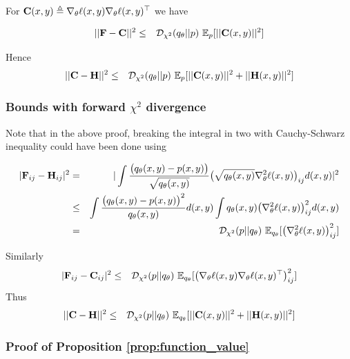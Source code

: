For ${\mathbf{C}}(x, y) \triangleq \nabla_\theta \ell(x, y) \nabla_\theta \ell(x, y)^\top$ we have

\begin{eqnarray*}
||{\mathbf{F}} - {\mathbf{C}}||^2 &\le& {\mathcal{D}}_{\chi^2}(q_\theta||p)\ \mathbb{E}_p [ ||{\mathbf{C}}(x, y)||^2 ]
\end{eqnarray*}

Hence
\begin{eqnarray*}
||{\mathbf{C}} - {\mathbf{H}}||^2 &\le& {\mathcal{D}}_{\chi^2}(q_\theta||p) \ \mathbb{E}_p [ ||{\mathbf{C}}(x, y)||^2  + ||{\mathbf{H}}(x, y)||^2]
\end{eqnarray*}

\subsubsection{Bounds with forward \texorpdfstring{$\chi^2$}{chi-2} divergence}
Note that in the above proof, breaking the integral in two with Cauchy-Schwarz inequality could have been done using

\begin{eqnarray*}
|{\mathbf{F}}_{ij} - {\mathbf{H}}_{ij}|^2 &=& |\int \frac{\big(q_\theta(x, y) - p(x, y)\big)}{\sqrt{q_\theta(x, y)}} \big(\sqrt{q_\theta(x, y)} \nabla_\theta^2 \ell(x, y)\big)_{ij} d(x, y)|^2\\
&\le& \int \frac{\big(q_\theta(x, y) - p(x, y)\big)^2}{q_\theta(x, y)} d(x, y) \int q_\theta(x, y)  \big(\nabla_\theta^2 \ell(x, y)\big)_{ij}^2 d(x, y)\\
&=& {\mathcal{D}}_{\chi^2}(p||q_\theta) \ \mathbb{E}_{q_\theta} [ \big(\nabla_\theta^2 \ell(x, y)\big)_{ij}^2 ]
\end{eqnarray*}

Similarly
\begin{eqnarray*}
    |\rmF_{ij} - \rmC_{ij}|^2  &\le& \gD_{\chi^2}(p||\q) \ \E_{\q} [ \big(\nabla_\theta \ell(x, y) \nabla_\theta \ell(x, y)^\top \big)_{ij}^2 ]
\end{eqnarray*}
Thus 
\begin{eqnarray*}
||{\mathbf{C}} - {\mathbf{H}}||^2 &\le& {\mathcal{D}}_{\chi^2}(p||q_\theta) \ \mathbb{E}_{q_\theta} [ ||{\mathbf{C}}(x, y)||^2  + ||{\mathbf{H}}(x, y)||^2]
\end{eqnarray*}

\subsubsection{Proof of Proposition \ref{prop:function_value}}
\label{proof:function_value}



